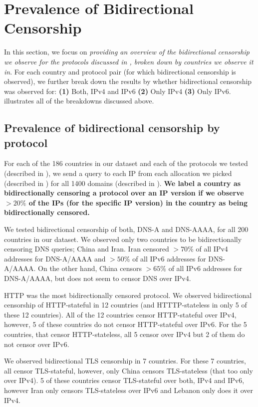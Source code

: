 \section{Prevalence of Bidirectional Censorship}
\PrevalenceGeneral
\label{sec:prevalence}
 In this section, we focus on \emph{providing an overview of the bidirectional censorship we observe for the protocols discussed in , broken down by countries we observe it in}.
For each country and protocol pair (for which bidirectional censorship is observed), we further break down the results by whether bidirectional censorship was observed for:
\textbf{(1)} Both, IPv4 and IPv6
\textbf{(2)} Only IPv4
\textbf{(3)} Only IPv6.
 illustrates all of the breakdowns discussed above.  

\subsection{Prevalence of bidirectional censorship by protocol}
\label{sec:prevalence:proto}
For each of the 186 countries in our dataset and each of the protocols we tested (described in ), we send a query to each IP from each allocation we picked (described in ) for all 1400 domains (described in ). \textbf{We label a country as bidirectionally censoring a protocol over an IP version if we observe $> 20\%$ of the IPs (for the specific IP version) in the country as being bidirectionally censored.}

We tested bidirectional censorship of both, DNS-A and DNS-AAAA, for all 200 countries in our dataset. We observed only two countries to be bidirectionally censoring DNS queries; China and Iran. Iran censored $>70\%$ of all IPv4 addresses for DNS-A/AAAA and $>50\%$ of all IPv6 addresses for DNS-A/AAAA. On the other hand, China censors $>65\%$ of all IPv6 addresses for DNS-A/AAAA, but does not seem to censor DNS over IPv4.  

HTTP was the most bidirectionally censored protocol. We observed bidirectional censorship of HTTP-stateful in 12 countries (and HTTTP-stateless in only 5 of these 12 countries). All of the 12 countries censor HTTP-stateful over IPv4, however, 5 of these countries do not censor HTTP-stateful over IPv6. For the 5 countries, that censor HTTP-stateless, all 5 censor over IPv4 but 2 of them do not censor over IPv6. 

We observed bidirectional TLS censorship in 7 countries. For these 7 countries, all censor TLS-stateful, however, only China censors TLS-stateless (that too only over IPv4). 5 of these countries censor TLS-stateful over both, IPv4 and IPv6, however Iran only censors TLS-stateless over IPv6 and Lebanon only does it over IPv4. 


